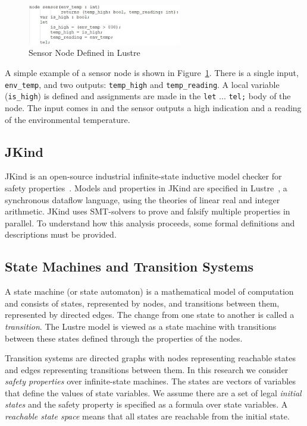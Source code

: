 \begin{figure}[h]
	\begin{center}
		\includegraphics[width=0.6\textwidth]{images/lustreExample.JPG}
	\end{center}
	\caption{Sensor Node Defined in Lustre}
	\label{fig:lustreExample}
\end{figure}

A simple example of a sensor node is shown in Figure~\ref{fig:lustreExample}. There is a single input, \texttt{env\_temp}, and two outputs: \texttt{temp\_high} and \texttt{temp\_reading}. A local variable (\texttt{is\_high}) is defined and assignments are made in the \texttt{let} ... \texttt{tel;} body of the node. The input comes in and the sensor outputs a high indication and a reading of the environmental temperature. 

\subsection{JKind}
JKind is an open-source industrial infinite-state inductive model checker for safety properties~\cite{2017arXiv171201222G}. Models and properties in JKind are specified in Lustre~\cite{Halbwachs91:IEEE}, a synchronous dataflow language, using the theories of linear real and integer arithmetic. JKind uses SMT-solvers to prove and falsify multiple properties in parallel. To understand how this analysis proceeds, some formal definitions and descriptions must be provided. 

\subsection{State Machines and Transition Systems}
\label{subsec:trans}
A state machine (or state automaton) is a mathematical model of computation and consists of states, represented by nodes, and transitions between them, represented by directed edges. The change from one state to another is called a {\em transition}. The Lustre model is viewed as a state machine with transitions between these states defined through the properties of the nodes. 

Transition systems are directed graphs with nodes representing reachable states and edges representing transitions between them. In this research we consider \emph{safety properties} over infinite-state machines. The states are vectors of variables that define the values of state variables. We assume there are a set of legal \emph{initial states} and the safety property is specified as a formula over state variables. A \emph{reachable state space} means that all states are reachable from the initial state. 

